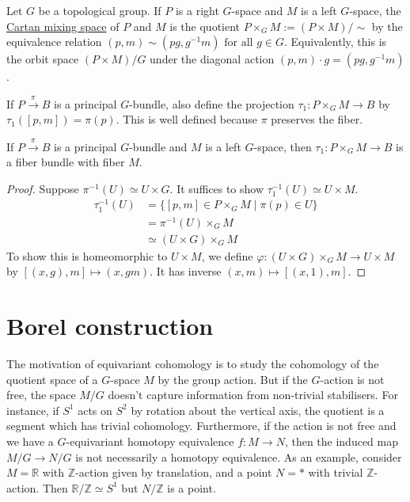 Let $G$ be a topological group.
If  $P$ is a right  $G$-space and  $M$ is a left  $G$-space, the 
\underline{Cartan mixing space} of  $P$ and  $M$ is the quotient 
$P\times_G M:= (P\times M) / \sim$ by the 
equivalence relation $(p,m)\sim (pg,g^{-1}m) \textrm{ for all }g\in G$.
Equivalently, this is the orbit space $(P\times M) /G$ under the diagonal action
$(p,m)\cdot g = (pg,g^{-1}m)$.

If $P\xrightarrow{\pi} B$ is a principal $G$-bundle, also define the projection
$\tau_1:P\times_GM\to B$ by $\tau_1([p,m])=\pi(p)$. This is well defined because
$\pi$ preserves the fiber.

\begin{prop} \label{prop:cartan_mixing}%
	If $P\xrightarrow{\pi} B$ is a principal  $G$-bundle and  $M$ is a left  $G$-space,
	then  $\tau_1 : P\times_G M\to B$ is a fiber bundle with fiber  $M$.
\end{prop}
\begin{proof}
	Suppose $\pi^{-1}(U)\simeq U\times G$. It suffices to show
	$\tau_1^{-1}(U)\simeq U\times M$. 
	\begin{align*}
		\tau_1^{-1}(U)
		&= \{[p,m]\in P\times_GM \mid \pi(p)\in U\} \\
		&= \pi^{-1}(U)\times _G M \\
		&\simeq (U\times G) \times_G M 
	\end{align*}
	To show this is homeomorphic to $U\times M$, we define 
	$\varphi:(U\times G) \times_G M \to U\times M$ by 
	$[(x,g),m] \mapsto (x,gm)$. It has inverse $(x,m)\mapsto [(x,1),m]$.
\end{proof}

\section{Borel construction}
The motivation of equivariant cohomology is to study the
cohomology of the quotient space of a $G$-space $M$ by the group action. 
But if the $G$-action is not free,
the space $M/G$ doesn't capture information from non-trivial stabilisers. For
instance, if  $S^1$ acts on $S^2$ by rotation about the vertical axis, the
quotient is a segment which has trivial cohomology. Furthermore, if the action is not
free and we have a $G$-equivariant homotopy equivalence  $f:M\to N$, then  
the induced map $M /G \to N /G$ is not necessarily a homotopy
equivalence. As an example, consider $M=\mathbb{R}$ with $\mathbb{Z}$-action
given by translation, and a point $N=*$ with trivial $\mathbb{Z}$-action. Then
$\mathbb{R} /\mathbb{Z} \simeq S^1$ but $N / \mathbb{Z}$ is a point.


